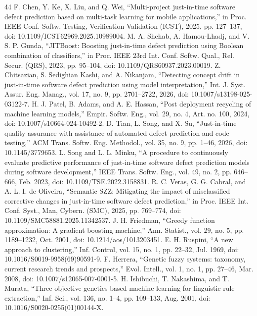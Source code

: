 \begin{thebibliography}{44}
 F. Chen, Y. Ke, X. Liu, and Q. Wei, ``Multi-project just-in-time software defect prediction based on multi-task learning for mobile applications,'' in Proc. IEEE Conf. Softw. Testing, Verification Validation (ICST), 2025, pp. 127--137, doi: \mbox{10.1109/ICST62969.2025.10989004}.
 M. A. Shehab, A. Hamou-Lhadj, and V. S. P. Gunda, ``JITBoost: Boosting just-in-time defect prediction using Boolean combination of classifiers,'' in Proc. IEEE 23rd Int. Conf. Softw. Qual., Rel. Secur. (QRS), 2023, pp. 95--104, doi: \mbox{10.1109/QRS60937.2023.00019}.
 Z. Chitsazian, S. Sedighian Kashi, and A. Nikanjam, ``Detecting concept drift in just-in-time software defect prediction using model interpretation,'' Int. J. Syst. Assur. Eng. Manag., vol. 17, no. 9, pp. 2701--2722, 2026, doi: \mbox{10.1007/s13198-025-03122-7}.
 H. J. Patel, B. Adams, and A. E. Hassan, ``Post deployment recycling of machine learning models,'' Empir. Softw. Eng., vol. 29, no. 4, Art. no. 100, 2024, doi: \mbox{10.1007/s10664-024-10492-2}.
 D. Tian, L. Song, and X. Su, ``Just-in-time quality assurance with assistance of automated defect prediction and code testing,'' ACM Trans. Softw. Eng. Methodol., vol. 35, no. 9, pp. 1--46, 2026, doi: \mbox{10.1145/3779653}.
 L. Song and L. L. Minku, ``A procedure to continuously evaluate predictive performance of just-in-time software defect prediction models during software development,'' IEEE Trans. Softw. Eng., vol. 49, no. 2, pp. 646--666, Feb. 2023, doi: \mbox{10.1109/TSE.2022.3158831}.
 R. C. Veras, G. G. Cabral, and A. L. I. de Oliveira, ``Semantic SZZ: Mitigating the impact of misclassified corrective changes in just-in-time software defect prediction,'' in Proc. IEEE Int. Conf. Syst., Man, Cybern. (SMC), 2025, pp. 769--774, doi: \mbox{10.1109/SMC58881.2025.11342537}.
 J. H. Friedman, ``Greedy function approximation: A gradient boosting machine,'' Ann. Statist., vol. 29, no. 5, pp. 1189--1232, Oct. 2001, doi: \mbox{10.1214/aos/1013203451}.
 E. H. Ruspini, ``A new approach to clustering,'' Inf. Control, vol. 15, no. 1, pp. 22--32, Jul. 1969, doi: \mbox{10.1016/S0019-9958(69)90591-9}.
 F. Herrera, ``Genetic fuzzy systems: taxonomy, current research trends and prospects,'' Evol. Intell., vol. 1, no. 1, pp. 27--46, Mar. 2008, doi: \mbox{10.1007/s12065-007-0001-5}.
 H. Ishibuchi, T. Nakashima, and T. Murata, ``Three-objective genetics-based machine learning for linguistic rule extraction,'' Inf. Sci., vol. 136, no. 1--4, pp. 109--133, Aug. 2001, doi: \mbox{10.1016/S0020-0255(01)00144-X}.

\end{thebibliography}
